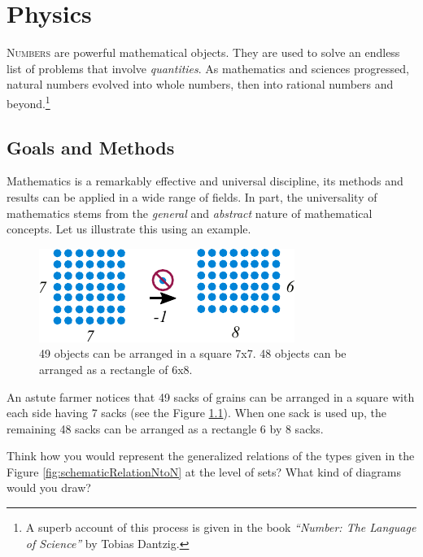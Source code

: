 \graphicspath{{../02Physics/pics/}}
	
\chapter[Physics]{Physics}\label{ch:Physics}

\lettrine[lines=2]{\color{darkocre}N}{umbers} are powerful
mathematical objects. They are used to solve
an endless list of problems that involve \emph{quantities}. As
mathematics
and sciences progressed, natural numbers evolved into whole
numbers, then into rational numbers and beyond.\footnote{A superb account of
this process is given in the book \emph{``Number: The Language of
Science''} by Tobias Dantzig.}

\section{Goals and Methods}
Mathematics is a remarkably effective and universal discipline, its
methods and
results can be applied in a wide range of fields. In part, the universality of mathematics
stems from the \emph{general} and \emph{abstract} nature of mathematical
concepts. Let us illustrate this using an example.

\begin{figure}%
  \includegraphics[scale=1.0]{numbersExampleGenerality}
  \caption{49 objects can be arranged in a square 7x7. 48 objects can
    be arranged as a rectangle of 6x8.}
  \label{fig:numbersExampleGenerality}
\end{figure}

An astute farmer notices that 49 sacks of grains can be arranged
in a square with each side having 7 sacks (see the Figure
\ref{fig:numbersExampleGenerality}). When one sack is used up, the
remaining 48 sacks can be arranged as a rectangle 6 by 8 sacks.


\begin{exercise}\label{exe:relationsGeneral}
Think how you would represent the generalized relations of the types
given in the Figure \ref{fig:schematicRelationNtoN} at the level of
sets? What kind of diagrams would you draw?
\end{exercise}

